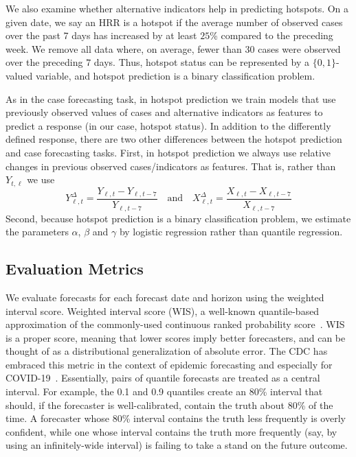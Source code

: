 \documentclass[9pt,twocolumn,twoside,lineno]{pnas-new}
\begin{document}
We also examine whether alternative indicators help in predicting hotspots. On a
given date, we say an HRR is a hotspot if the average number of observed cases
over the past 7 days has increased by at least $25$\% compared to the preceding
week. We remove all data where, on average, fewer than $30$ cases were observed
over the preceding $7$ days. Thus, hotspot status can be represented by a
$\{0,1\}$-valued variable, and hotspot prediction is a binary classification
problem.  

As in the case forecasting task, in hotspot prediction we train models that use
previously observed values of cases and alternative indicators as features to
predict a response (in our case, hotspot status). In addition to the differently
defined response, there are two other differences between the hotspot prediction
and case forecasting tasks. First, in hotspot prediction we always use relative
changes in previous observed cases/indicators as features. That is, rather than
$Y_{t,\ell}$ we use 
$$
Y^\Delta_{\ell,t} = \frac{Y_{\ell,t} - Y_{\ell,
    t-7}}{Y_{\ell,t-7}}\quad\text{and}\quad X^\Delta_{\ell,t} =
\frac{X_{\ell,t} - X_{\ell, t-7}}{X_{\ell,t-7}} 
$$ 
Second, because hotspot prediction is a binary classification problem, we
estimate the parameters $\alpha$, $\beta$ and $\gamma$ by logistic regression
rather than quantile regression. 

\subsection{Evaluation Metrics}

We evaluate forecasts for each forecast date and horizon using the weighted
interval score. Weighted interval score (WIS), a well-known quantile-based
approximation of the commonly-used continuous ranked probability
score~\cite{gneiting-proper-score}. WIS is a proper score, meaning that lower
scores imply better forecasters, and can be thought of as a distributional
generalization of absolute error. The CDC has embraced this metric in the
context of epidemic forecasting and especially for COVID-19~\cite{wis-paper}.
Essentially, pairs of quantile forecasts are treated as a central  interval. For
example, the 0.1 and 0.9 quantiles create an 80\% interval that should, if the
forecaster is well-calibrated, contain the truth about 80\% of the time. A
forecaster whose 80\% interval contains the truth less frequently is overly
confident, while one whose interval contains the truth more frequently (say, by
using an infinitely-wide interval) is failing to take a stand on the future
outcome.  
\end{document}
